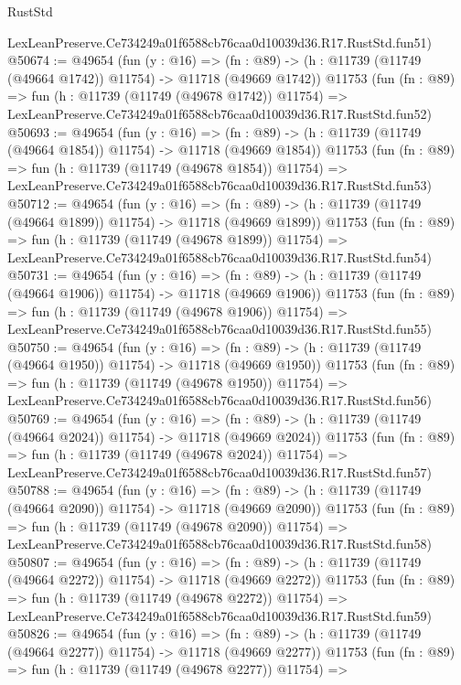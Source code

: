 \begin{lexlean}{RustStd}
\begin{coremodule}
    LexLeanPreserve.Ce734249a01f6588cb76caa0d10039d36.R17.RustStd.fun51)
@50674 := @49654
    (fun (y : @16) =>
    (fn : @89) -> (h : @11739 (@11749 (@49664 @1742)) @11754) -> @11718 (@49669 @1742))
    @11753
    (fun (fn : @89) =>
    fun (h : @11739 (@11749 (@49678 @1742)) @11754) =>
    LexLeanPreserve.Ce734249a01f6588cb76caa0d10039d36.R17.RustStd.fun52)
@50693 := @49654
    (fun (y : @16) =>
    (fn : @89) -> (h : @11739 (@11749 (@49664 @1854)) @11754) -> @11718 (@49669 @1854))
    @11753
    (fun (fn : @89) =>
    fun (h : @11739 (@11749 (@49678 @1854)) @11754) =>
    LexLeanPreserve.Ce734249a01f6588cb76caa0d10039d36.R17.RustStd.fun53)
@50712 := @49654
    (fun (y : @16) =>
    (fn : @89) -> (h : @11739 (@11749 (@49664 @1899)) @11754) -> @11718 (@49669 @1899))
    @11753
    (fun (fn : @89) =>
    fun (h : @11739 (@11749 (@49678 @1899)) @11754) =>
    LexLeanPreserve.Ce734249a01f6588cb76caa0d10039d36.R17.RustStd.fun54)
@50731 := @49654
    (fun (y : @16) =>
    (fn : @89) -> (h : @11739 (@11749 (@49664 @1906)) @11754) -> @11718 (@49669 @1906))
    @11753
    (fun (fn : @89) =>
    fun (h : @11739 (@11749 (@49678 @1906)) @11754) =>
    LexLeanPreserve.Ce734249a01f6588cb76caa0d10039d36.R17.RustStd.fun55)
@50750 := @49654
    (fun (y : @16) =>
    (fn : @89) -> (h : @11739 (@11749 (@49664 @1950)) @11754) -> @11718 (@49669 @1950))
    @11753
    (fun (fn : @89) =>
    fun (h : @11739 (@11749 (@49678 @1950)) @11754) =>
    LexLeanPreserve.Ce734249a01f6588cb76caa0d10039d36.R17.RustStd.fun56)
@50769 := @49654
    (fun (y : @16) =>
    (fn : @89) -> (h : @11739 (@11749 (@49664 @2024)) @11754) -> @11718 (@49669 @2024))
    @11753
    (fun (fn : @89) =>
    fun (h : @11739 (@11749 (@49678 @2024)) @11754) =>
    LexLeanPreserve.Ce734249a01f6588cb76caa0d10039d36.R17.RustStd.fun57)
@50788 := @49654
    (fun (y : @16) =>
    (fn : @89) -> (h : @11739 (@11749 (@49664 @2090)) @11754) -> @11718 (@49669 @2090))
    @11753
    (fun (fn : @89) =>
    fun (h : @11739 (@11749 (@49678 @2090)) @11754) =>
    LexLeanPreserve.Ce734249a01f6588cb76caa0d10039d36.R17.RustStd.fun58)
@50807 := @49654
    (fun (y : @16) =>
    (fn : @89) -> (h : @11739 (@11749 (@49664 @2272)) @11754) -> @11718 (@49669 @2272))
    @11753
    (fun (fn : @89) =>
    fun (h : @11739 (@11749 (@49678 @2272)) @11754) =>
    LexLeanPreserve.Ce734249a01f6588cb76caa0d10039d36.R17.RustStd.fun59)
@50826 := @49654
    (fun (y : @16) =>
    (fn : @89) -> (h : @11739 (@11749 (@49664 @2277)) @11754) -> @11718 (@49669 @2277))
    @11753
    (fun (fn : @89) =>
    fun (h : @11739 (@11749 (@49678 @2277)) @11754) =>

\end{coremodule}
\end{lexlean}
